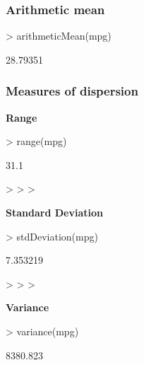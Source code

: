 \documentclass[a4paper]{article}
\begin{document}

\subsubsection*{Arithmetic mean}

\begin{Schunk}
\begin{Sinput}
> arithmeticMean(mpg)
\end{Sinput}
\begin{Soutput}
[1] 28.79351
\end{Soutput}
\end{Schunk}


\subsubsection*{Measures of dispersion}


\textbf{Range}


\begin{Schunk}
\begin{Sinput}
> range(mpg)
\end{Sinput}
\begin{Soutput}
[1] 31.1
\end{Soutput}
\begin{Sinput}
> 
> 
> 
\end{Sinput}
\end{Schunk}

\textbf{Standard Deviation}



\begin{Schunk}
\begin{Sinput}
> stdDeviation(mpg)
\end{Sinput}
\begin{Soutput}
[1] 7.353219
\end{Soutput}
\begin{Sinput}
> 
> 
> 
\end{Sinput}
\end{Schunk}



\textbf{Variance}

\begin{Schunk}
\begin{Sinput}
> variance(mpg)
\end{Sinput}
\begin{Soutput}
[1] 8380.823
\end{Soutput}
\end{Schunk}
\end{document}
